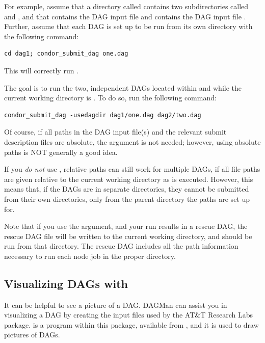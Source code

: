 For example, assume that a directory called 
contains two subdirectories called  and
, and that  contains the DAG input file 
and  contains the DAG input file .
Further, assume that each DAG is set up to be run
from its own directory with the following command:
\begin{verbatim}
cd dag1; condor_submit_dag one.dag
\end{verbatim}
This will correctly run .

The goal is to run the two, independent DAGs located within
 and  while the current working directory
is .  To do so, run the following command:
\begin{verbatim}
condor_submit_dag -usedagdir dag1/one.dag dag2/two.dag
\end{verbatim}

Of course, if all paths in the DAG input file(s) and the relevant submit
description files are absolute,
the  argument is not needed;
however, using absolute paths is NOT generally a good idea.

If you \emph{do not} use , relative paths can still work
for multiple DAGs, if
all file paths are given relative to
the current working directory as  is executed.
However, this means that, if the DAGs are in separate directories, they
cannot be submitted from their own directories, only from the parent
directory the paths are set up for.

Note that if you use the  argument, and your run
results in a rescue DAG, the rescue DAG file will be written to
the current working directory, and should be run from that directory.
The rescue DAG includes all the path information necessary to
run each node job in the proper directory.


\subsection{Visualizing DAGs with }

It can be helpful to see a picture of a DAG.
DAGMan can assist you in visualizing a DAG by creating
the input files used by the AT\&T Research Labs 
 package. 
 is a program within this package,
available from ,
and it is used to draw pictures of DAGs. 

